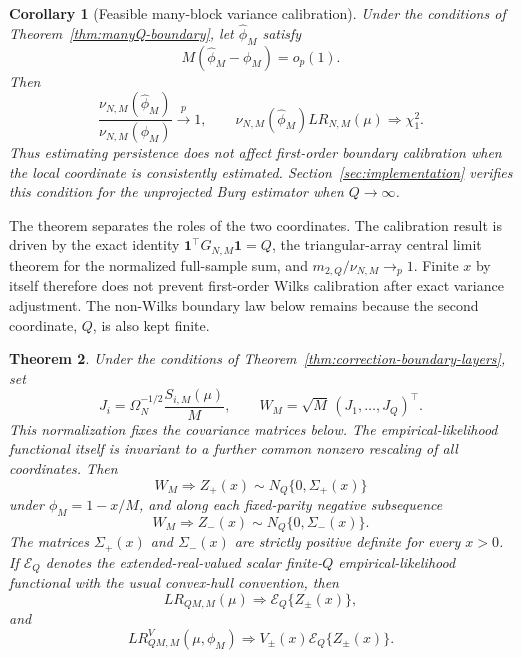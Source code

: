 \documentclass[12pt]{article}
\newtheorem{Theorem}{Theorem}[section]
\newtheorem{Corollary}[Theorem]{Corollary}
\theoremstyle{remark}
\begin{document}
\begin{Corollary}[Feasible many-block variance calibration]
\label{cor:feasible-manyQ-boundary}
Under the conditions of Theorem~\ref{thm:manyQ-boundary}, let $\widehat\phi_M$ satisfy
\[
M(\widehat\phi_M-\phi_M)=o_p(1).
\]
Then
\[
\frac{\nu_{N,M}(\widehat\phi_M)}
{\nu_{N,M}(\phi_M)}
\xrightarrow{p}1,
\qquad
\nu_{N,M}(\widehat\phi_M)LR_{N,M}(\mu)
\Rightarrow\chi_1^2.
\]
Thus estimating persistence does not affect first-order boundary calibration when the local coordinate is consistently estimated. Section~\ref{sec:implementation} verifies this condition for the unprojected Burg estimator when $Q\to\infty$.
\end{Corollary}

The theorem separates the roles of the two coordinates. The calibration result is driven by the exact identity $\mathbf 1^\top G_{N,M}\mathbf 1=Q$, the triangular-array central limit theorem for the normalized full-sample sum, and $m_{2,Q}/\nu_{N,M}\to_p1$. Finite $x$ by itself therefore does not prevent first-order Wilks calibration after exact variance adjustment. The non-Wilks boundary law below remains because the second coordinate, $Q$, is also kept finite.

\begin{Theorem}
\label{thm:fixedQ-boundary-law}
Under the conditions of Theorem~\ref{thm:correction-boundary-layers}, set
\[
J_i=\Omega_N^{-1/2}\frac{S_{i,M}(\mu)}{M},
\qquad
W_M=\sqrt M\,(J_1,\ldots,J_Q)^\top.
\]
This normalization fixes the covariance matrices below. The empirical-likelihood functional itself is invariant to a further common nonzero rescaling of all coordinates. Then
\[
W_M\Rightarrow Z_+(x)\sim N_Q\{0,\Sigma_+(x)\}
\]
under $\phi_M=1-x/M$, and along each fixed-parity negative subsequence
\[
W_M\Rightarrow Z_-(x)\sim N_Q\{0,\Sigma_-(x)\}.
\]
The matrices $\Sigma_+(x)$ and $\Sigma_-(x)$ are strictly positive definite for every $x>0$. If $\mathcal E_Q$ denotes the extended-real-valued scalar finite-$Q$ empirical-likelihood functional with the usual convex-hull convention, then
\begin{equation}
LR_{QM,M}(\mu)\Rightarrow\mathcal E_Q\{Z_\pm(x)\},
\label{eq:fixedQ-raw-boundary-law}
\end{equation}
and
\begin{equation}
LR^V_{QM,M}(\mu,\phi_M)\Rightarrow V_\pm(x)\mathcal E_Q\{Z_\pm(x)\}.
\label{eq:fixedQ-vc-boundary-law}
\end{equation}
\end{Theorem}
\end{document}
